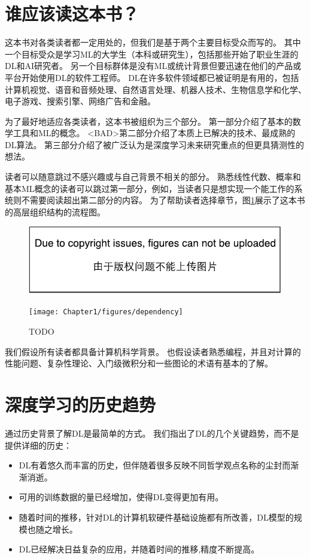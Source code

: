 \section{谁应该读这本书？}
\label{sec:who_should_read_this_book}

这本书对各类读者都一定用处的，但我们是基于两个主要目标受众而写的。
其中一个目标受众是学习\gls{ML}的大学生（本科或研究生），包括那些开始了职业生涯的\gls{DL}和\gls{AI}研究者。
另一个目标群体是没有\gls{ML}或统计背景但要迅速在他们的产品或平台开始使用\gls{DL}的软件工程师。
\gls{DL}在许多软件领域都已被证明是有用的，包括计算机视觉、语音和音频处理、自然语言处理、机器人技术、生物信息学和化学、电子游戏、搜索引擎、网络广告和金融。


为了最好地适应各类读者，这本书被组织为三个部分。
第一部分介绍了基本的数学工具和\gls{ML}的概念。
<BAD>第二部分介绍了本质上已解决的技术、最成熟的\gls{DL}算法。
第三部分介绍了被广泛认为是深度学习未来研究重点的但更具猜测性的想法。

读者可以随意跳过不感兴趣或与自己背景不相关的部分。
熟悉线性代数、概率和基本\gls{ML}概念的读者可以跳过第一部分，例如，当读者只是想实现一个能工作的系统则不需要阅读超出第二部分的内容。
为了帮助读者选择章节，图\ref{fig:chap1_dependency}展示了这本书的高层组织结构的流程图。
\begin{figure}[!htb]
\ifOpenSource
\centerline{\includegraphics{figure.pdf}}
\else
\centerline{\texttt{[image: Chapter1/figures/dependency]}}
\fi
\caption{TODO}
\label{fig:chap1_dependency}
\end{figure}


我们假设所有读者都具备计算机科学背景。
也假设读者熟悉编程，并且对计算的性能问题、复杂性理论、入门级微积分和一些图论的术语有基本的了解。

\section{深度学习的历史趋势}
\label{sec:historical_trends_in_deep_learning}
通过历史背景了解\gls{DL}是最简单的方式。
我们指出了\gls{DL}的几个关键趋势，而不是提供详细的历史：
\begin{itemize}
 \item \gls{DL}有着悠久而丰富的历史，但伴随着很多反映不同哲学观点名称的尘封而渐渐消逝。
 \item 可用的训练数据的量已经增加，使得\gls{DL}变得更加有用。
 \item 随着时间的推移，针对\gls{DL}的计算机软硬件基础设施都有所改善，\gls{DL}模型的规模也随之增长。
 \item \gls{DL}已经解决日益复杂的应用，并随着时间的推移,精度不断提高。
\end{itemize}

